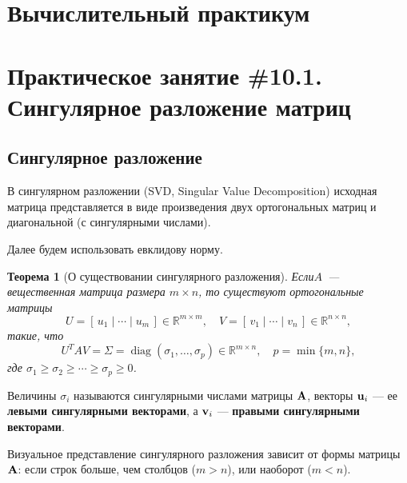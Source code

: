\documentclass[12pt]{article}
\newtheorem{theorem}{Теорема}
\begin{document}
	\begin{flushright}
	\end{flushright}
	\begin{flushright}
	\end{flushright}
    \section*{Вычислительный практикум}
    \section*{Практическое занятие \#10.1. Сингулярное разложение матриц}
	
	\subsection*{Сингулярное разложение}
	
	В сингулярном разложении (SVD, Singular Value Decomposition) исходная матрица представляется в виде произведения двух ортогональных матриц и диагональной (с сингулярными числами).
	
	Далее будем использовать евклидову норму.
	
	\begin{theorem}[О существовании сингулярного разложения]
		Если\linebreak $A$~--- вещественная матрица размера $m \times n$,
		то существуют ортогональные матрицы
		\begin{equation}
			U = [\, u_1 \mid \cdots \mid u_m \,] \in \mathbb{R}^{m \times m},
			\quad
			V = [\, v_1 \mid \cdots \mid v_n \,] \in \mathbb{R}^{n \times n},
		\end{equation}
		такие, что
		\begin{equation}
			U^T A V = \Sigma = \operatorname{diag}(\sigma_1, \ldots, \sigma_p) \in \mathbb{R}^{m \times n},
			\quad
			p = \min\{m, n\},
		\end{equation}
		где $\sigma_1 \geqslant \sigma_2 \geqslant \cdots \geqslant \sigma_p \geqslant 0$.
	\end{theorem}
	
		Величины $\sigma_i$ называются сингулярными числами матрицы $\textbf{\textup{A}}$, 
		векторы $\textbf{\textup{u}}_i$ --- ее \textbf{левыми сингулярными векторами}, 
		а $\textbf{\textup{v}}_i$ --- \textbf{правыми сингулярными векторами}.  
		
		Визуальное представление сингулярного разложения зависит от формы матрицы $\textbf{\textup{A}}$: 
		если строк больше, чем столбцов ($m > n$), или наоборот ($m < n$).  
		
\end{document}
